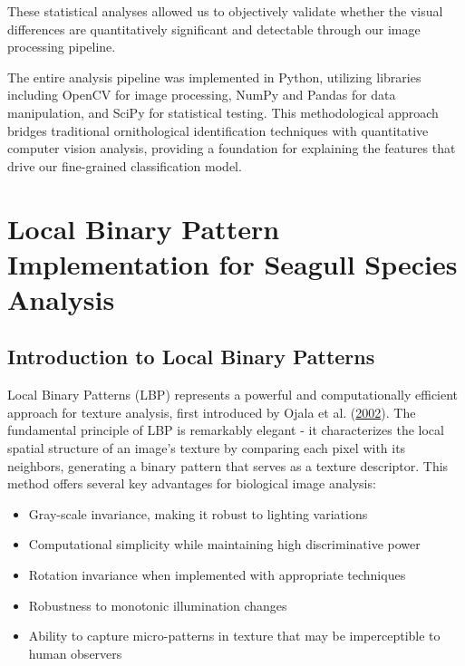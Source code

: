 \documentclass[a4paper,12pt]{report}
\begin{document}

These statistical analyses allowed us to objectively validate whether the visual differences are quantitatively significant and detectable through our image processing pipeline.

The entire analysis pipeline was implemented in Python, utilizing libraries including OpenCV for image processing, NumPy and Pandas for data manipulation, and SciPy for statistical testing. This methodological approach bridges traditional ornithological identification techniques with quantitative computer vision analysis, providing a foundation for explaining the features that drive our fine-grained classification model.

\section{Local Binary Pattern Implementation for Seagull Species Analysis}

\subsection{Introduction to Local Binary Patterns}

Local Binary Patterns (LBP) represents a powerful and computationally efficient approach for texture analysis, first introduced by Ojala et al. (\href{https://ieeexplore.ieee.org/stamp/stamp.jsp?tp=&arnumber=1017623}{2002}). The fundamental principle of LBP is remarkably elegant - it characterizes the local spatial structure of an image's texture by comparing each pixel with its neighbors, generating a binary pattern that serves as a texture descriptor. This method offers several key advantages for biological image analysis:

\begin{itemize}
    \item Gray-scale invariance, making it robust to lighting variations
    \item Computational simplicity while maintaining high discriminative power
    \item Rotation invariance when implemented with appropriate techniques
    \item Robustness to monotonic illumination changes
    \item Ability to capture micro-patterns in texture that may be imperceptible to human observers
\end{itemize}
\end{document}
